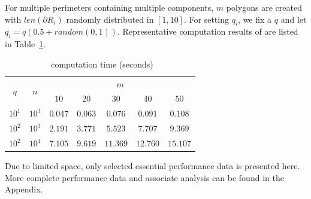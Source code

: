 For multiple perimeters containing multiple components, $m$ polygons 
are created with $len(\partial R_i)$ randomly distributed in $[1, 10]$. 
For setting $q_i$, we fix a $q$ and let $q_i = q(0.5 + random(0, 1))$. 
Representative computation results of \algoMRG are listed in 
Table~\ref{eval:opg-mpmc}.
\begin{table}[ht!]
    \vspace*{-2mm}
    \footnotesize
    \centering
    \begin{tabular}{|c|c|c|c|c|c|c|} 
        \hline
        \multirow{2}{*}{$q$} & \multirow{2}{*}{$n$} & \multicolumn{5}{|c|}{$m$} \\ \cline{3-7}
        \rule{0pt}{2.5ex} & & $10$ & $20$ & $30$ & $40$ & $50$ \\ \hline
        \rule{0pt}{2.5ex} $10^1$ & $10^3$ & $ 0.047$ & $ 0.063$ & $ 0.076$ & $ 0.091$ & $ 0.108$ \\ \hline
        \rule{0pt}{2.5ex} $10^2$ & $10^3$ & $ 2.191$ & $ 3.771$ & $ 5.523$ & $ 7.707$ & $ 9.369$ \\ \hline
        \rule{0pt}{2.5ex} $10^2$ & $10^4$ & $ 7.105$ & $ 9.619$ & $11.369$ & $12.760$ & $15.107$ \\ \hline
    \end{tabular}
    \vspace*{-3mm}
    \caption{\label{eval:opg-mpmc} \algoMRG~computation time (seconds)}
    \vspace*{-4mm}
\end{table}

Due to limited space, only selected essential performance data is 
presented here. More complete performance data and associate analysis 
can be found in the Appendix. 

